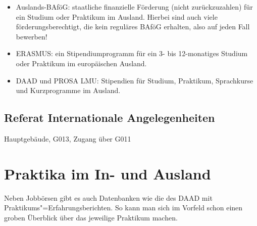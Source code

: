 \begin{itemize}
\item Auslands-BAföG: staatliche finanzielle Förderung (nicht zurückzuzahlen) für ein Studium oder Praktikum im Ausland. Hierbei sind auch viele förderungsberechtigt, die kein reguläres BAföG erhalten, also auf jeden Fall bewerben!
\item ERASMUS: ein Stipendiumprogramm für ein 3- bis 12-monatiges Studium oder Praktikum im europäischen Ausland.
\item DAAD und PROSA LMU: Stipendien für Studium, Praktikum, Sprachkurse und Kurzprogramme im Ausland.
\end{itemize}

\subsection*{Referat Internationale Angelegenheiten}
Hauptgebäude, G013, Zugang über G011

\begin{urlList}
\end{urlList}

\section{Praktika im In- und Ausland}

Neben Jobbörsen gibt es auch Datenbanken wie die des DAAD mit
Praktikums"=Erfahrungsberichten. So kann man sich im Vorfeld schon
einen groben Überblick über das jeweilige Praktikum machen.

\begin{urlList}
\end{urlList}
